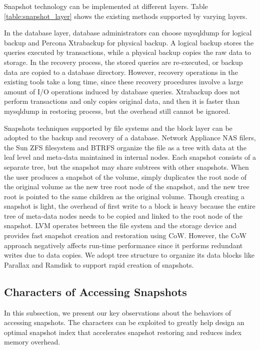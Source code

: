 \documentclass[sigconf, nonacm]{acmart}
\begin{document}
Snapshot technology can be implemented at different layers. Table \ref{table:snapshot_layer}  shows the existing methods supported by varying layers.

In the database layer, database administrators can choose mysqldump \cite{mysqldump} for logical backup and Percona Xtrabackup \cite{xtrabackup} for physical backup. A logical backup stores the queries executed by transactions, while a physical backup copies the raw data to storage. In the recovery process, the stored queries are re-executed, or backup data are copied to a database directory. However, recovery operations in the existing tools take a long time, since these recovery procedures involve a large amount of I/O operations induced by database queries. Xtrabackup does not perform transactions and only copies original data, and then it is faster than mysqldump in restoring process, but the overhead still cannot be ignored. 

Snapshots techniques supported by file systems and the block layer can be adopted to the backup and recovery of a database. Network Appliance NAS filers, the Sun ZFS filesystem \cite{rodeh2003zfs} and BTRFS \cite{rodeh2013btrfs} organize the file as a tree with data at the leaf level and meta-data maintained in internal nodes. Each snapshot consists of a separate tree, but the snapshot may share subtrees with other snapshots. When the user produces a snapshot of the volume, simply duplicates the root node of the original volume as the new tree root node of the snapshot, and the new tree root is pointed to the same children as the original volume.  
Though creating a snapshot is light, the overhead of first write to a block is heavy because the entire tree of meta-data nodes needs to be copied and linked to the root node of the snapshot. 
LVM \cite{hasenstein2001logical} operates between the file system and the storage device and provides fast snapshot creation and restoration using CoW. However, the CoW approach negatively affects run-time performance since it performs redundant writes due to data copies.
We adopt tree structure to organize its data blocks like Parallax \cite{DBLP:conf/eurosys/MeyerACLFHW08} and Ramdisk \cite{nielsen1999use} to support rapid creation of snapshots.

\subsection{Characters of Accessing Snapshots}
\label{Characters}
In this subsection, we present our key observations about the behaviors of accessing snapshots. The characters can be exploited to greatly help design an optimal snapshot index that accelerates snapshot restoring and reduces index memory overhead.
\end{document}
